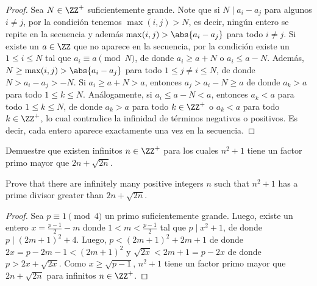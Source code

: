 \begin{proof}
  Sea $N\in\ZZ^+$ suficientemente grande. Note que si $N\mid a_i-a_j$ para
  algunos $i\ne j$, por la condición tenemos $\max(i,j)>N$, es decir, ningún
  entero se repite en la secuencia y además $\max(i,j)>\abs{a_i-a_j}$ para todo
  $i\ne j$. Si existe un $a\in\ZZ$ que no aparece en la secuencia, por la
  condición existe un $1\le i\le N$ tal que $a_i\equiv a\pmod N$, de donde
  $a_i\ge a+N$ o $a_i\le a-N$. Además, $N\ge\max(i,j)>\abs{a_i-a_j}$ para todo
  $1\le j\ne i\le N$, de donde $N>a_i-a_j>-N$. Si $a_i\ge a+N>a$, entonces
  $a_j>a_i-N\ge a$ de donde $a_k>a$ para todo $1\le k\le N$. Análogamente, si
  $a_i\le a-N<a$, entonces $a_k<a$ para todo $1\le k\le N$, de donde $a_k>a$
  para todo $k\in\ZZ^+$ o $a_k<a$ para todo $k\in\ZZ^+$, lo cual contradice la
  infinidad de términos negativos o positivos. Es decir, cada entero aparece
  exactamente una vez en la secuencia.
\end{proof}

\begin{probEG}
  Demuestre que existen infinitos $n\in\ZZ^+$ para los cuales $n^2+1$ tiene un
  factor primo mayor que $2n+\sqrt{2n}$.
  \begin{hint}
    Prove that there are infinitely many positive integers $n$ such that $n^2+1$
    has a prime divisor greater than $2n+\sqrt{2n}$.
  \end{hint}
\end{probEG}

\begin{proof}
  Sea $p\equiv 1\pmod 4$ un primo suficientemente grande. Luego, existe un
  entero $x=\frac{p-1}{2}-m$ donde $1<m<\frac{p-1}{2}$ tal que $p\mid x^2+1$, de
  donde $p\mid(2m+1)^2+4$. Luego, $p<(2m+1)^2+2m+1$ de donde
  $2x=p-2m-1<(2m+1)^2$ y $\sqrt{2x}<2m+1=p-2x$ de donde $p>2x+\sqrt{2x}$. Como
  $x\ge\sqrt{p-1}$, $n^2+1$ tiene un factor primo mayor que $2n+\sqrt{2n}$ para
  infinitos $n\in\ZZ^+$.
\end{proof}
